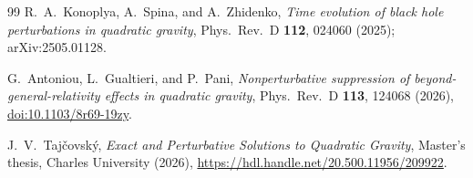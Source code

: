 \documentclass[11pt]{article}
\theoremstyle{definition}
\theoremstyle{remark}
\begin{document}
\begin{thebibliography}{99}
R.~A.~Konoplya, A.~Spina, and A.~Zhidenko,
\emph{Time evolution of black hole perturbations in quadratic gravity},
Phys.\ Rev.\ D \textbf{112}, 024060 (2025);
arXiv:2505.01128.

G.~Antoniou, L.~Gualtieri, and P.~Pani,
\emph{Nonperturbative suppression of beyond-general-relativity effects in
quadratic gravity},
Phys.\ Rev.\ D \textbf{113}, 124068 (2026),
\href{https://doi.org/10.1103/8r69-19zy}{doi:10.1103/8r69-19zy}.

J.~V.~Taj\v covsk\'y,
\emph{Exact and Perturbative Solutions to Quadratic Gravity},
Master's thesis, Charles University (2026),
\url{https://hdl.handle.net/20.500.11956/209922}.

\end{thebibliography}
\end{document}
